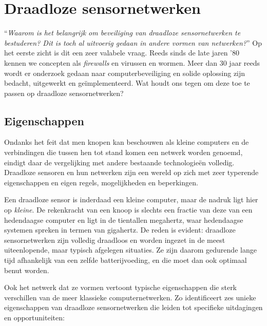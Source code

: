\section{Draadloze sensornetwerken}
\label{section:landscape}

``\emph{Waarom is het belangrijk om beveiliging van draadloze sensornetwerken
te bestuderen? Dit is toch al uitvoerig gedaan in andere vormen van
netwerken?}'' Op het eerste zicht is dit een zeer valabele vraag. Reeds sinds
de late jaren '80 kennen we concepten als \emph{firewalls} en virussen en
wormen. Meer dan 30 jaar reeds wordt er onderzoek gedaan naar
computerbeveiliging en solide oplossing zijn bedacht, uitgewerkt en
ge\"implementeerd. Wat houdt ons tegen om deze toe te passen op draadloze
sensornetwerken?

\subsection{Eigenschappen}

Ondanks het feit dat men knopen kan beschouwen als kleine computers en de
verbindingen die tussen hen tot stand komen een netwerk worden genoemd, eindigt
daar de vergelijking met andere bestaande technologie\"en volledig. Draadloze
sensoren en hun netwerken zijn een wereld op zich met zeer typerende
eigenschappen en eigen regels, mogelijkheden en beperkingen.

Een draadloze sensor is inderdaad een kleine computer, maar de nadruk ligt hier
op \emph{kleine}. De rekenkracht van een knoop is slechts een fractie van deze
van een hedendaagse computer en ligt in de tientallen megahertz, waar
hedendaagse systemen spreken in termen van gigahertz. De reden is evident:
draadloze sensornetwerken zijn volledig draadloos en worden ingezet in de meest
uiteenlopende, maar typisch afgelegen situaties. Ze zijn daarom gedurende lange
tijd afhankelijk van een zelfde batterijvoeding, en die moet dan ook optimaal
benut worden.

Ook het netwerk dat ze vormen vertoont typische eigenschappen die sterk
verschillen van de meer klassieke computernetwerken. Zo identificeert
\cite{blilat2012wireless} zes unieke eigenschappen van draadloze
sensornetwerken die leiden tot specifieke uitdagingen en opportuniteiten:

